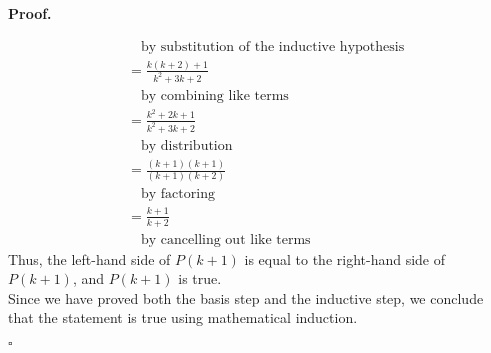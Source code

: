 \documentclass{article}
\newenvironment{proof}{
    \begin{mdframed}[nobreak=false, innerleftmargin=10pt, innerrightmargin=10pt, innertopmargin=10pt, innerbottommargin=10pt]
    \textbf{Proof.}
}{
    \hfill $\square$
    \end{mdframed}
}
\begin{document}
\begin{proof}
\begin{align*}
            & \quad \text{by substitution of the inductive hypothesis} \\
            &= \frac{k(k+2)+1}{k^2+3k+2} \\
            & \quad \text{by combining like terms} \\
            &= \frac{k^2 +2k + 1}{k^2 + 3k + 2} \\
            & \quad \text{by distribution} \\
            &= \frac{(k+1)(k+1)}{(k+1)(k+2)} \\
            & \quad \text{by factoring}\\
            &= \frac{k+1}{k+2} \\
            & \quad \text{by cancelling out like terms}
        \end{align*}
        Thus, the left-hand side of $P(k+1)$ is equal to the right-hand side of $P(k+1)$, and $P(k+1)$ is true. \\
        Since we have proved both the basis step and the inductive step, we conclude that the statement is true using mathematical induction.
    \end{proof}
\end{document}
